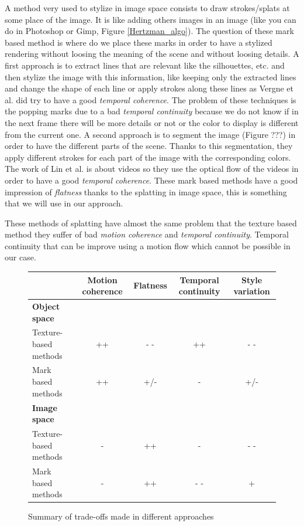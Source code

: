 A method very used to stylize in image space consists to draw strokes/splats at some place of the image\cite{bleron_motion-coherent_2018, vergne_implicit_2011, benard_active_nodate, zeng_image_2009, grabli_programmable_2010}. It is like adding others images in an image (like you can do in Photoshop or Gimp, Figure \ref{Hertzman_algo}). The question of these mark based method is where do we place these marks in order to have a stylized rendering without loosing the meaning of the scene and without loosing details. A first approach is to extract lines that are relevant like the silhouettes, etc. \cite{vergne_implicit_2011, grabli_programmable_2010, lee_line_nodate} and then stylize the image with this information, like keeping only the extracted lines and change the shape of each line or apply strokes along these lines as Vergne et al.\cite{vergne_implicit_2011} did try to have a good \textit{temporal coherence}. The problem of these techniques is the popping marks due to a bad \textit{temporal continuity} because we do not know if in the next frame there will be more details or not or the color to display is different from the current one.
A second approach is to segment the image (Figure ???) in order to have the different parts of the scene\cite{zeng_image_2009, lin_video_nodate}. Thanks to this segmentation, they apply different strokes for each part of the image with the corresponding colors. The work of Lin et al.\cite{lin_video_nodate} is about videos so they use the optical flow of the videos in order to have a good \textit{temporal coherence}. These mark based methods have a good impression of \textit{flatness} thanks to the splatting in image space, this is something that we will use in our approach.

These methods of splatting have almost the same problem that the texture based method they suffer of bad \textit{motion coherence} and \textit{temporal continuity}. Temporal continuity that can be improve using a motion flow which cannot be possible in our case. 


\begin{figure}

    \begin{tabular}{|l|*{4}{c|}}
    \hline
         & \textbf{Motion coherence} & \textbf{Flatness} & \textbf{Temporal continuity} & \textbf{Style variation} \\
    \hline
    \textbf{Object space} & & & & \\
    \hline
    Texture-based methods & ++ & - - & ++ & - - \\
    \hline
    Mark based methods & ++ & +/- & - & +/- \\
    \hline
    \textbf{Image space} & & & & \\
    \hline
    Texture-based methods & -  & ++ & - & - - \\
    \hline
    Mark based methods & - & ++ & - - & + \\
    \hline
    \end{tabular}

    \caption{Summary of trade-offs made in different approaches}
    \label{tableau_comparatif}
\end{figure}
